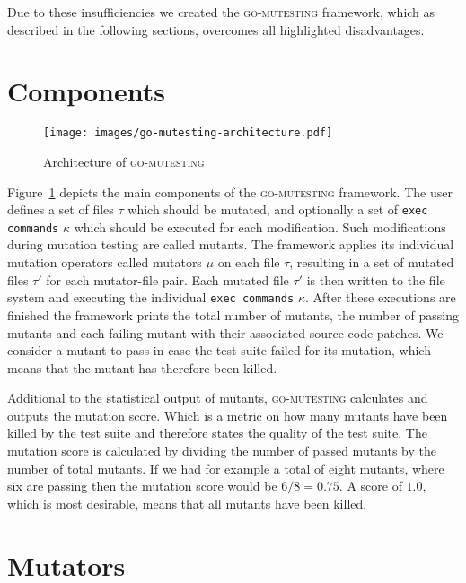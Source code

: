 Due to these insufficiencies we created the \textsc{go-mutesting} framework, which as described in the following sections, overcomes all highlighted disadvantages.

\section{Components}
\label{sec:goMutestingComponents}

\begin{figure}[t]
\hspace*{-1.5cm}\texttt{[image: images/go-mutesting-architecture.pdf]}
\caption{Architecture of \textsc{go-mutesting}}
\label{fig:goMutestingArchitecture}
\end{figure}

Figure~\ref{fig:goMutestingArchitecture} depicts the main components of the \textsc{go-mutesting} framework. The user defines a set of files $\tau$ which should be mutated, and optionally a set of \texttt{exec commands} $\kappa$ which should be executed for each modification. Such modifications during mutation testing are called mutants. The framework applies its individual mutation operators called mutators $\mu$ on each file $\tau$, resulting in a set of mutated files $\tau'$ for each mutator-file pair. Each mutated file $\tau'$ is then written to the file system and executing the individual \texttt{exec commands} $\kappa$. After these executions are finished the framework prints the total number of mutants, the number of passing mutants and each failing mutant with their associated source code patches. We consider a mutant to pass in case the test suite failed for its mutation, which means that the mutant has therefore been killed.

Additional to the statistical output of mutants, \textsc{go-mutesting} calculates and outputs the mutation score. Which is a metric on how many mutants have been killed by the test suite and therefore states the quality of the test suite. The mutation score is calculated by dividing the number of passed mutants by the number of total mutants. If we had for example a total of eight mutants, where six are passing then the mutation score would be $6 / 8 = 0.75$. A score of $1.0$, which is most desirable, means that all mutants have been killed.

\section{Mutators}
\label{sec:goMutestingMutators}

